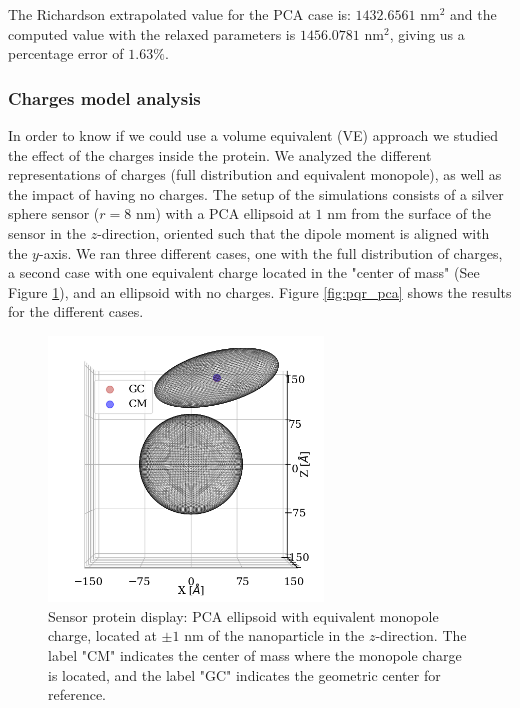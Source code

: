 The Richardson extrapolated value for the PCA case is: $1432.6561$ nm$^2$ and the computed value with the relaxed parameters 
is $1456.0781$ nm$^2$, giving us a percentage error of $1.63 \%$. 

\subsubsection{Charges model analysis} \label{ssub:pqr_analysis}

In order to know if we could use a volume equivalent (VE) approach we studied the effect of the charges inside the protein. We analyzed
the different representations of charges (full distribution and equivalent monopole), as well as the impact of having
no charges. The setup of the simulations consists of a silver sphere sensor ($r=8$ nm) with a PCA ellipsoid 
at $1$ nm from the surface of the sensor in the $z$-direction, oriented such that the dipole moment is aligned with the $y$-axis. We ran 
three different cases, one with the full distribution of charges, a second case with one equivalent charge located in the
"center of mass" (See Figure \ref{fig:one_pca_cm_sketch}), and an ellipsoid with no charges. Figure 
\ref{fig:pqr_pca} shows the results for the different cases.

\begin{figure}%
    \centering
    \includegraphics[width=0.65\textwidth]{viz/one_pca_cm_gc_display.png} 
    \caption{Sensor protein display: PCA ellipsoid with equivalent monopole charge, located at $\pm 1$ nm of the 
    nanoparticle in the $z$-direction. The label "CM" indicates the center of mass where the monopole charge is located, and
    the label "GC" indicates the geometric center for reference.}
    \label{fig:one_pca_cm_sketch}
 \end{figure}

